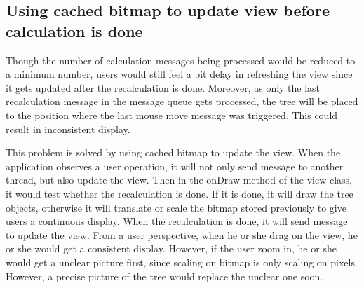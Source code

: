 \documentclass[MSc]{icldt}
\begin{document}
\subsection{Using cached bitmap to update view before calculation is done}
 
 Though the number of calculation messages being processed would be reduced to a minimum number, users would still feel a bit delay in refreshing the view since it gets updated after the recalculation is done. Moreover, as only the last recalculation message in the message queue gets processed, the tree will be placed to the position where the last mouse move message was triggered. This could result in inconsistent display. 

This problem is solved by using cached bitmap to update the view. When the application observes a user operation, it will not only send message to another thread, but also update the view. Then in the onDraw method of the view class, it would test whether the recalculation is done. If it is done, it will draw the tree objects, otherwise it will translate or scale the bitmap stored previously to give users a continuous display. When the recalculation is done, it will send message to update the view. From a user perspective, when he or she drag on the view, he or she would get a consistent display. However, if the user zoom in, he or she would get a unclear picture first, since scaling on bitmap is only scaling on pixels. However, a precise picture of the tree would replace the unclear one soon. 

\end{document}
